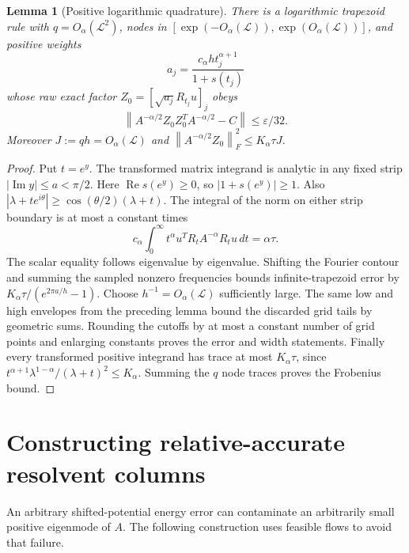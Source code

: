 \documentclass[11pt]{article}
\newtheorem{lemma}[theorem]{Lemma}
\newcommand{\norm}[1]{\left\lVert#1\right\rVert}
\begin{document}
\begin{lemma}[Positive logarithmic quadrature]
There is a logarithmic trapezoid rule with $q=O_\alpha(\mathcal L^2)$,
nodes in $[\exp(-O_\alpha(\mathcal L)),
\exp(O_\alpha(\mathcal L))]$, and positive weights
\[
 a_j=\frac{c_\alpha h t_j^{\alpha+1}}{1+s(t_j)}
\]
whose raw exact factor $Z_0=[\sqrt{a_j}R_{t_j}u]_j$ obeys
\[
 \norm{A^{-\alpha/2}Z_0Z_0^TA^{-\alpha/2}-C}
 \le\varepsilon/32.
\]
Moreover $J:=qh=O_\alpha(\mathcal L)$ and
$\norm{A^{-\alpha/2}Z_0}_F^2\le K_\alpha\tau J$.
\end{lemma}
\begin{proof}
Put $t=e^y$. The transformed matrix integrand is analytic in any fixed
strip $|\operatorname{Im}y|\le a<\pi/2$. Here
$\operatorname{Re}s(e^y)\ge0$, so $|1+s(e^y)|\ge1$.
Also $|\lambda+te^{i\theta}|\ge\cos(\theta/2)(\lambda+t)$.
The integral of the norm on either strip boundary is at most a constant
times
\[
 c_\alpha\int_0^\infty t^\alpha
       u^T R_t A^{-\alpha}R_tu\,dt=\alpha\tau.
\]
The scalar equality follows eigenvalue by eigenvalue. Shifting the
Fourier contour and summing the sampled nonzero frequencies bounds
infinite-trapezoid error by
$K_\alpha\tau/(e^{2\pi a/h}-1)$.
Choose $h^{-1}=O_\alpha(\mathcal L)$ sufficiently large.
The same low and high envelopes from the preceding lemma bound the
discarded grid tails by geometric sums. Rounding the cutoffs by at
most a constant number of grid points and enlarging constants proves
the error and width statements.
Finally every transformed positive integrand has trace at most
$K_\alpha\tau$, since
$t^{\alpha+1}\lambda^{1-\alpha}/(\lambda+t)^2\le K_\alpha$.
Summing the $q$ node traces proves the Frobenius bound.
\end{proof}

\section{Constructing relative-accurate resolvent columns}
An arbitrary shifted-potential energy error can contaminate an
arbitrarily small positive eigenmode of $A$. The following construction
uses feasible flows to avoid that failure.
\end{document}
